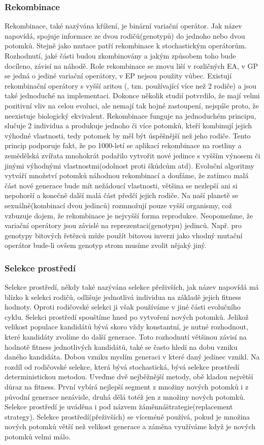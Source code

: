 \subsubsection{Rekombinace}
Rekombinace, také nazývána křížení, je binární variační operátor. Jak název napovídá, spojuje informace ze dvou rodičů(genotypů) do jednoho nebo dvou potomků. Stejně jako mutace patří rekombinace k stochastickým operátorům. Rozhodnutí, jaké části budou zkombinovány a jakým způsobem toho bude docíleno, závisí na náhodě. Role rekombinace se znovu liší v rozličných EA, v GP se jedná o jediné variační operátory, v EP nejsou použity vůbec. Existují  rekombinační operátory s vyšší aritou (, tzn.  používající více než 2 rodiče) a jsou také jednoduché na implementaci. Dokonce několik studií potvrdilo, že mají velmi pozitivní vliv na celou evoluci, ale nemají tak hojné zastoupení, nejspíše proto, že neexistuje biologický ekvivalent. Rekombinace funguje na jednoduchém principu, slučuje 2 individua a produkuje jednoho či více potomků, kteří kombinují jejich výhodné vlastnosti, tedy potomek by měl být úspěšnější než jeho rodiče. Tento princip podporuje fakt, že po 1000-letí se aplikací rekombinace na rostliny a zemědělská zvířata mnohokrát podařilo vytvořit nové jedince s vyšším výnosem či jinými výhodnými vlastnostmi(odolnost proti škůdcům atd). Evoluční algoritmy vytváří množství potomků náhodnou rekombinací a doufáme, že zatímco malá část nové generace bude mít nežádoucí vlastnosti, většina se nezlepší ani si nepohorší a konečně další malá část předčí jejich rodiče. Na naší planetě se sexuálně(kombinací dvou jedinců) rozmnožují pouze vyšší organismy, což vzbuzuje dojem, že rekombinace je nejvyšší forma reprodukce. Neopomeňme, že  variační operátory jsou závislé na reprezentaci(genotypu) jedinců. Např. pro genotypy bitových řetězců může použít bitovou inverzi jako vhodný mutační operátor bude-li ovšem genotyp strom musíme zvolit nějaký jiný. 
\subsubsection{Selekce prostředí}
Selekce prostředí, někdy také nazývána selekce přeživších, jak název napovídá má blízko k selekci rodičů, odlišuje jednotlivá individua na základě jejich fitness hodnoty. Oproti rodičovské selekci ji však používáme v jiné části evolučního cyklu. Selekci prostředí spouštíme hned po vytvoření nových potomků. Jelikož velikost populace kandidátů bývá skoro vždy konstantní, je nutné rozhodnout, které kandidáty zvolíme do další generace. Toto rozhodnutí většinou závisí na hodnotě fitness jednotlivých kandidátů, také se často hledí na dobu vzniku daného kandidáta. Dobou vzniku myslím generaci v které daný jedinec vznikl. Na rozdíl od rodičovské selekce, která bývá stochastická, bývá selekce prostředí deterministickou metodou. Uveďme dvě nejběžnější metody, obě kladou největší důraz na fitness. První vybírá nejlepší segment z množiny nových potomků i z původní generace nezávisle, druhá dělá totéž jen z množiny nových potomků. Selekce prostředí je uváděna i pod názvem \"záměnná\" strategie(replacement strategy). Selekce prostředí(přeživších) se víceméně používá, pokud je množina nových potomků větší než velikost generace a záměna využíváme když je nových potomků velmi málo.
